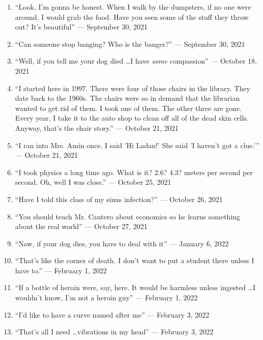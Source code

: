 \documentclass[12pt]{article}
\begin{document}
\begin{enumerate}
  \item “Look, I'm gonna be honest. When I walk by the dumpsters, if no one were around, I would grab the food. Have you seen some of the stuff they throw out? It's beautiful” — September 30, 2021

  \item “Can someone stop banging? Who is the banger?” — September 30, 2021

  \item “Well, if you tell me your dog died \dots I have \textit{some} compassion” — October 18, 2021

  \item “I started here in 1997. There were four of those chairs in the library. They date back to the 1960s. The chairs were so in demand that the librarian wanted to get rid of them. I took one of them. The other three are gone. Every year, I take it to the auto shop to clean off all of the dead skin cells. Anyway, that's the chair story.” — October 21, 2021

  \item “I ran into Mrs. Amin once. I said 'Hi Ladan!' She said 'I haven't got a clue.'” — October 21, 2021 

  \item “I took physics a long time ago. What is it? 2.6? 4.3? meters per second per second. Oh, well I was close.” — October 25, 2021

  \item “Have I told this class of my sinus infection?” — October 26, 2021

  \item “You should teach Mr. Cautero about economics so he learns something about the real world” — October 27, 2021


  \item “Now, if your dog dies, you have to deal with it” — January 6, 2022

  \item “That's like the corner of death. I don't want to put a student there unless I have to.” — February 1, 2022

  \item ``If a bottle of heroin were, say, here. It would be harmless unless ingested \dots I wouldn't know, I'm not a heroin guy'' — February 1, 2022

  \item “I'd like to have a curve named after me” — February 3, 2022

  \item “That's all I need \dots vibrations in my head” — February 3, 2022


\end{enumerate}
\end{document}

